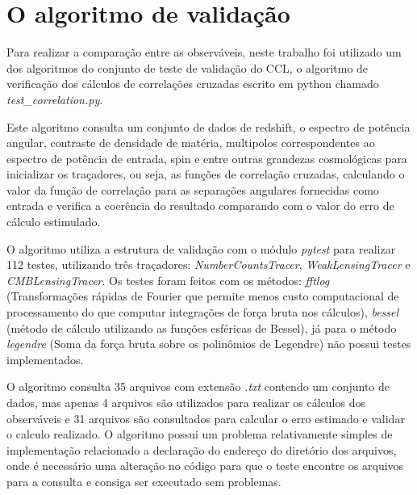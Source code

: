 \section*{O algoritmo de validação}

Para realizar a comparação entre as observáveis, neste trabalho foi utilizado um dos algoritmos do conjunto de teste de validação do CCL, o algoritmo de verificação dos cálculos de correlações cruzadas escrito em python chamado  \textit{test\_correlation.py}.

Este algoritmo consulta um conjunto de dados de redshift, o espectro de potência angular, contraste de densidade de matéria, multipolos correspondentes ao espectro de potência de entrada, spin e entre outras grandezas cosmológicas para inicializar os traçadores, ou seja, as funções de correlação cruzadas, calculando o valor da função de correlação para as separações angulares fornecidas como entrada e verifica a coerência do resultado comparando com o valor do erro de cálculo estimulado.

O algoritmo utiliza a estrutura de validação com o módulo \textit{pytest} para realizar 112 testes, utilizando três traçadores:  \textit{NumberCountsTracer}, \textit{WeakLensingTracer} e \textit{CMBLensingTracer}. Os testes foram feitos com os métodos: \textit{fftlog} (Transformações rápidas de Fourier que permite menos custo computacional de processamento do que computar integrações de força bruta nos cálculos), \textit{bessel} (método de cálculo utilizando as funções esféricas de Bessel), já para o método \textit{legendre} (Soma da força bruta sobre os polinômios de Legendre) não possui testes implementados.

O algoritmo consulta 35 arquivos com extensão \textit{.txt} contendo um conjunto de dados, mas apenas 4 arquivos são utilizados para realizar os cálculos dos observáveis e 31 arquivos são consultados para calcular o erro estimado e validar o calculo realizado. O algoritmo possui um problema relativamente simples de implementação relacionado a declaração do endereço do diretório dos arquivos, onde é necessário uma alteração no código para que o teste encontre os arquivos para a consulta e consiga ser executado sem problemas. 

